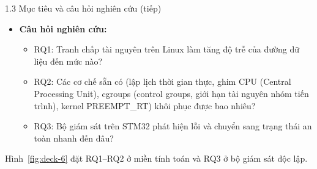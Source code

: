 \documentclass[aspectratio=169,12pt,t]{beamer}
\newcommand{\captiontype}{\small}
\newcommand{\figagain}[1]{\par\smallskip{\centering\captiontype\color{muted}Hình~\ref{fig:#1}: \csuse{caption#1}\par}}
\begin{document}
\begin{frame}{1.3 Mục tiêu và câu hỏi nghiên cứu (tiếp)}
\begin{itemize}
\item \textbf{Câu hỏi nghiên cứu:}
\begin{itemize}
\item RQ1: Tranh chấp tài nguyên trên Linux làm tăng độ trễ của đường dữ liệu đến mức nào?
\item RQ2: Các cơ chế sẵn có (lập lịch thời gian thực, ghim CPU (Central Processing Unit), cgroups (control groups, giới hạn tài nguyên nhóm tiến trình), kernel PREEMPT\_RT) khôi phục được bao nhiêu?
\item RQ3: Bộ giám sát trên STM32 phát hiện lỗi và chuyển sang trạng thái an toàn nhanh đến đâu?
\end{itemize}
\end{itemize}
\vfill
Hình~\ref{fig:deck-6} đặt RQ1–RQ2 ở miền tính toán và RQ3 ở bộ giám sát độc lập.
\par\vfill
\begin{minipage}{\linewidth}\centering
{}
\figagain{deck-6}
\end{minipage}

\end{frame}
\end{document}
